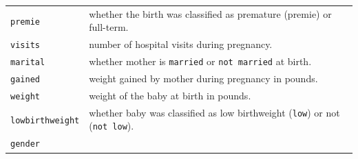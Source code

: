 \documentclass[]{book}
\theoremstyle{definition}
\theoremstyle{definition}
\theoremstyle{remark}
\begin{document}
\begin{longtable}[]{@{}ll@{}}
\begin{minipage}[t]{0.22\columnwidth}
\texttt{premie}\strut
\end{minipage} & \begin{minipage}[t]{0.16\columnwidth}\raggedright\strut
whether the birth was classified as premature (premie) or
full-term.\strut
\end{minipage}\tabularnewline
\begin{minipage}[t]{0.22\columnwidth}\raggedright\strut
\texttt{visits}\strut
\end{minipage} & \begin{minipage}[t]{0.16\columnwidth}\raggedright\strut
number of hospital visits during pregnancy.\strut
\end{minipage}\tabularnewline
\begin{minipage}[t]{0.22\columnwidth}\raggedright\strut
\texttt{marital}\strut
\end{minipage} & \begin{minipage}[t]{0.16\columnwidth}\raggedright\strut
whether mother is \texttt{married} or \texttt{not\ married} at
birth.\strut
\end{minipage}\tabularnewline
\begin{minipage}[t]{0.22\columnwidth}\raggedright\strut
\texttt{gained}\strut
\end{minipage} & \begin{minipage}[t]{0.16\columnwidth}\raggedright\strut
weight gained by mother during pregnancy in pounds.\strut
\end{minipage}\tabularnewline
\begin{minipage}[t]{0.22\columnwidth}\raggedright\strut
\texttt{weight}\strut
\end{minipage} & \begin{minipage}[t]{0.16\columnwidth}\raggedright\strut
weight of the baby at birth in pounds.\strut
\end{minipage}\tabularnewline
\begin{minipage}[t]{0.22\columnwidth}\raggedright\strut
\texttt{lowbirthweight}\strut
\end{minipage} & \begin{minipage}[t]{0.16\columnwidth}\raggedright\strut
whether baby was classified as low birthweight (\texttt{low}) or not
(\texttt{not\ low}).\strut
\end{minipage}\tabularnewline
\begin{minipage}[t]{0.22\columnwidth}\raggedright\strut
\texttt{gender}\strut
\end{minipage} & \begin{minipage}[t]{0.16\columnwidth}\raggedright\strut

\end{minipage}
\end{longtable}
\end{document}
